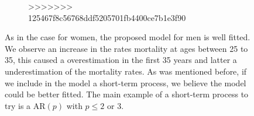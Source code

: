 \documentclass[smallextended]{svjour3}
\begin{document}
\begin{figure}[H]
\begin{figure}[H]
>>>>>>> 125467f8c56768ddf5205701fb4400ce7b1e3f90
    \label{graph-simu_FOU3}
\end{figure}
\pagebreak
As in the case for women, the proposed model for men is well fitted.
We observe an increase in the rates mortality at ages between 25 to 35, this
caused a overestimation in the first 35 years and latter a underestimation
of the mortality rates. As was mentioned before, if we include in the model a
short-term process,  we believe the model could be better fitted. The main
example  of a short-term process to try is a AR$(p)$ with $p\le 2$ or $3$.



\end{figure}
\end{document}
